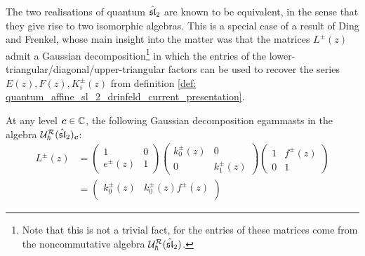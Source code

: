         The two realisations of quantum $\hat{\sl}_2$ are known to be equivalent, in the sense that they give rise to two isomorphic algebras. This is a special case of a result of Ding and Frenkel, whose main insight into the matter was that the matrices $L^{\pm}(z)$ admit a Gaussian decomposition\footnote{Note that this is not a trivial fact, for the entries of these matrices come from the noncommutative algebra $\calU_{\hbar}^{\calR}(\hat{\sl}_2)$.} in which the entries of the lower-triangular/diagonal/upper-triangular factors can be used to recover the series $E(z), F(z), K_i^{\pm}(z)$ from definition \ref{def: quantum_affine_sl_2_drinfeld_current_presentation}.
        \begin{lemma} \label{lemma: ding_frenkel_isomorphism_quantum_affine_sl_2}
            At any level $\level \in \bbC$, the following Gaussian decomposition egammasts in the algebra $\calU_{\hbar}^{\calR}(\hat{\sl}_2)_{\level}$:
                \begin{equation} \label{equation: quantum_affine_sl_2_monodromy_matrices_gaussian_decompositions}
                    \begin{aligned}
                        L^{\pm}(z)
                        & =
                            \begin{pmatrix}
                                1 & 0
                                \\
                                e^{\pm}(z) & 1
                            \end{pmatrix}
                            \begin{pmatrix}
                                k_0^{\pm}(z) & 0
                                \\
                                0 & k_1^{\pm}(z)
                            \end{pmatrix}
                            \begin{pmatrix}
                                1 & f^{\pm}(z)
                                \\
                                0 & 1
                            \end{pmatrix}
                        \\
                        & =
                            \begin{pmatrix}
                                k_0^{\pm}(z) & k_0^{\pm}(z) f^{\pm}(z)
                                \\

\end{pmatrix}
\end{aligned}
\end{equation}
\end{lemma}
